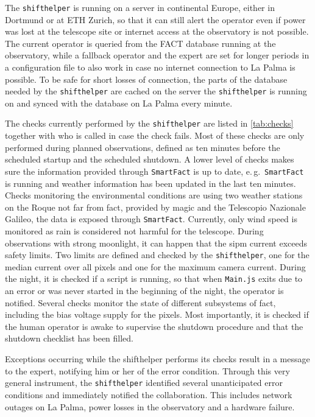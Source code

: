 The \texttt{shifthelper} is running  on a server in continental Europe, either in Dortmund
or at ETH Zurich,
so that it can still alert the operator even if power was lost at the telescope site
or internet access at the observatory is not possible.
The current operator is queried from the FACT database running at the observatory,
while a fallback operator and the expert are set for longer periods in a configuration file to also work
in case no internet connection to La Palma is possible.
To be safe for short losses of connection, the parts of the database needed 
by the \texttt{shifthelper} are cached on the server the \texttt{shifthelper} is running on and
synced with the database on La Palma every minute.


The checks currently performed by the \texttt{shifthelper} are listed in \autoref{tab:checks}
together with who is called in case the check fails.
Most of these checks are only performed during planned observations,
defined as ten minutes before the scheduled startup and the scheduled shutdown.
A lower level of checks makes sure the information provided through \texttt{SmartFact} 
is up to date, e.\,g.\ \texttt{SmartFact} is running and weather information has been updated in the last ten minutes.
Checks monitoring the environmental conditions are using two weather stations
on the Roque not far from \gls{fact}, provided by \gls{magic} and the Telescopio Nazionale Galileo, the data is exposed through \texttt{SmartFact}.
Currently, only wind speed is monitored as rain is considered not harmful for the telescope.
During observations with strong moonlight, it can happen that the \gls{sipm} current
exceeds safety limits.
Two limits are defined and checked by the \texttt{shifthelper}, one for the median current
over all pixels and one for the maximum camera current.
During the night, it is checked if a script is running, so that when \texttt{Main.js} exits
due to an error or was never started in the beginning of the night, the operator is notified.
Several checks monitor the state of different subsystems of \gls{fact},
including the bias voltage supply for the pixels.
Most importantly, it is checked if the human operator is awake to supervise the shutdown 
procedure and that the shutdown checklist has been filled.

Exceptions occurring while the shifthelper performs its checks result in a message
to the expert, notifying him or her of the error condition.
Through this very general instrument, the \texttt{shifthelper} identified several unanticipated error conditions and immediately notified the collaboration.
This includes network outages on La Palma, power losses in the observatory and a hardware failure.


